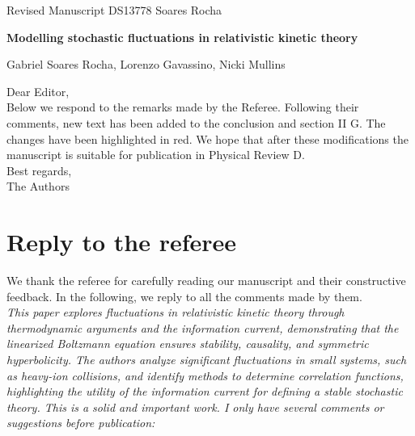 \documentclass[preprint]{revtex4-1}
\begin{document}
\begin{center}

\Large{Revised Manuscript DS13778 Soares Rocha
}\\

\vspace{0.5cm}

{\bf \Large{Modelling stochastic fluctuations in relativistic kinetic theory}}\\

\vspace{0.5cm}

\normalsize{Gabriel Soares Rocha, Lorenzo Gavassino, Nicki Mullins}\\

\vspace{0.5cm}



\end{center}

\vspace{0.5cm}

\noindent
Dear Editor,\\

Below we respond to the remarks made by the Referee. Following their comments, new text has been added to the conclusion and section II G. The changes have been highlighted in red. We hope that after these modifications the manuscript is suitable for publication in Physical Review D. \\
 
\noindent
Best regards,\\

\noindent
The Authors\\

\newpage

\section*{Reply to the referee}

We thank the referee for carefully reading our manuscript and their constructive feedback. In the following, we reply to all the comments made by them.\\


\textit{This paper explores fluctuations in relativistic kinetic theory through thermodynamic arguments and the information current, demonstrating that the linearized Boltzmann equation ensures stability, causality, and symmetric hyperbolicity. The authors analyze significant fluctuations in small systems, such as heavy-ion collisions, and identify methods to determine correlation functions, highlighting the utility of the information current for defining a stable stochastic theory. This is a solid and important work. I only have several comments or suggestions before publication:}
\end{document}
